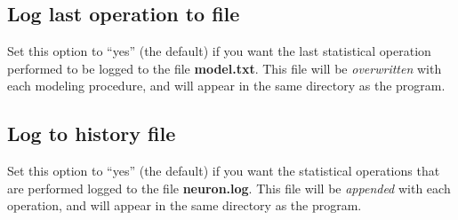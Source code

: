 \subsection{Log last operation to file}

Set this option to ``yes'' (the default) if you want the last
statistical operation performed to be logged to the file {\bf
model.txt}.  This file will be {\em overwritten} with each modeling
procedure, and will appear in the same directory as the program.

\subsection{Log to history file}

Set this option to ``yes'' (the default) if you want the statistical
operations that are performed logged to the file {\bf neuron.log}.
This file will be {\em appended} with each operation, and will appear
in the same directory as the program.
